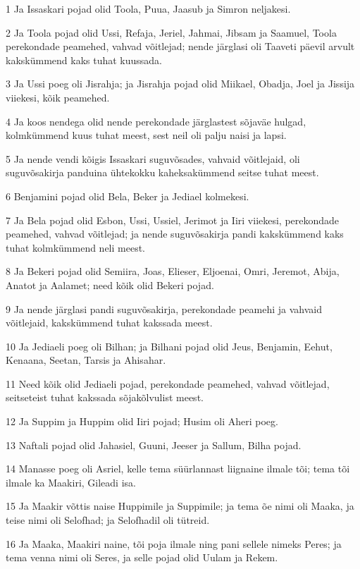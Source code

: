 \par 1 Ja Issaskari pojad olid Toola, Puua, Jaasub ja Simron neljakesi.
\par 2 Ja Toola pojad olid Ussi, Refaja, Jeriel, Jahmai, Jibsam ja Saamuel, Toola perekondade peamehed, vahvad võitlejad; nende järglasi oli Taaveti päevil arvult kakskümmend kaks tuhat kuussada.
\par 3 Ja Ussi poeg oli Jisrahja; ja Jisrahja pojad olid Miikael, Obadja, Joel ja Jissija viiekesi, kõik peamehed.
\par 4 Ja koos nendega olid nende perekondade järglastest sõjaväe hulgad, kolmkümmend kuus tuhat meest, sest neil oli palju naisi ja lapsi.
\par 5 Ja nende vendi kõigis Issaskari suguvõsades, vahvaid võitlejaid, oli suguvõsakirja panduina ühtekokku kaheksakümmend seitse tuhat meest.
\par 6 Benjamini pojad olid Bela, Beker ja Jediael kolmekesi.
\par 7 Ja Bela pojad olid Esbon, Ussi, Ussiel, Jerimot ja Iiri viiekesi, perekondade peamehed, vahvad võitlejad; ja nende suguvõsakirja pandi kakskümmend kaks tuhat kolmkümmend neli meest.
\par 8 Ja Bekeri pojad olid Semiira, Joas, Elieser, Eljoenai, Omri, Jeremot, Abija, Anatot ja Aalamet; need kõik olid Bekeri pojad.
\par 9 Ja nende järglasi pandi suguvõsakirja, perekondade peamehi ja vahvaid võitlejaid, kakskümmend tuhat kakssada meest.
\par 10 Ja Jediaeli poeg oli Bilhan; ja Bilhani pojad olid Jeus, Benjamin, Eehut, Kenaana, Seetan, Tarsis ja Ahisahar.
\par 11 Need kõik olid Jediaeli pojad, perekondade peamehed, vahvad võitlejad, seitseteist tuhat kakssada sõjakõlvulist meest.
\par 12 Ja Suppim ja Huppim olid Iiri pojad; Husim oli Aheri poeg.
\par 13 Naftali pojad olid Jahasiel, Guuni, Jeeser ja Sallum, Bilha pojad.
\par 14 Manasse poeg oli Asriel, kelle tema süürlannast liignaine ilmale tõi; tema tõi ilmale ka Maakiri, Gileadi isa.
\par 15 Ja Maakir võttis naise Huppimile ja Suppimile; ja tema õe nimi oli Maaka, ja teise nimi oli Selofhad; ja Selofhadil oli tütreid.
\par 16 Ja Maaka, Maakiri naine, tõi poja ilmale ning pani sellele nimeks Peres; ja tema venna nimi oli Seres, ja selle pojad olid Uulam ja Rekem.
